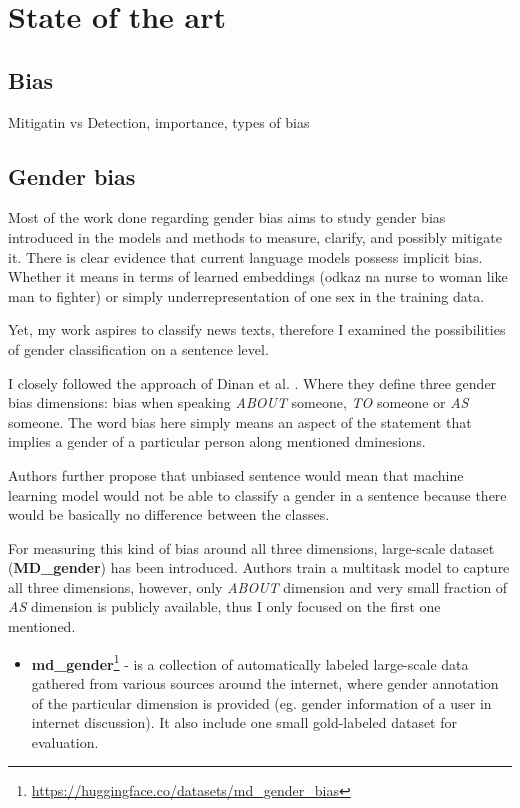 \chapter{State of the art}

\section{Bias}
Mitigatin vs Detection, importance, types of bias
\section{Gender bias}
Most of the work done regarding gender bias aims to study gender bias introduced in the models and methods to measure, clarify, and possibly mitigate it.
There is clear evidence that current language models possess implicit bias. Whether it means in terms of learned embeddings (odkaz na nurse to woman like man to fighter) or simply underrepresentation of one sex in the training data. 

Yet, my work aspires to classify news texts, therefore I examined the possibilities of gender classification on a sentence level.

I closely followed the approach of Dinan et al. \cite{dinan2020multi}. Where they define three gender bias dimensions: bias when speaking \textit{ABOUT} someone, \textit{TO} someone or \textit{AS} someone. The word bias here simply means an aspect of the statement that implies a gender of a particular person along mentioned dminesions.

Authors further propose that unbiased sentence would mean that machine learning model would not be able to classify a gender in a sentence because there would be basically no difference between the classes.

For measuring this kind of bias around all three dimensions, large-scale dataset (\textbf{MD\_gender}) has been introduced. Authors train a multitask model to capture all three dimensions, however, only \textit{ABOUT} dimension and very small fraction of \textit{AS} dimension is publicly available, thus I only focused on the first one mentioned.

\begin{itemize}
\item \textbf{md\_gender}\footnote{\url{https://huggingface.co/datasets/md_gender_bias}} - is a collection of automatically labeled large-scale data gathered from various sources around the internet, where gender annotation of the particular dimension is provided (eg. gender information of a user in internet discussion). It also include one small gold-labeled dataset for evaluation.
\end{itemize}

